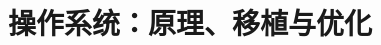 \documentclass[../../main.tex]{subfiles}
\begin{document}
\chapter{操作系统：原理、移植与优化}
\label{ch:07-operating-system}








\end{document}
